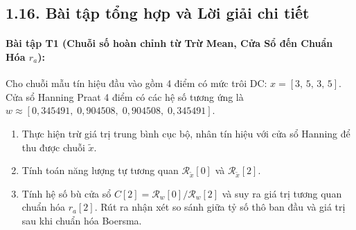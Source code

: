 \subsection*{1.16. Bài tập tổng hợp và Lời giải chi tiết}

\paragraph{Bài tập T1 (Chuỗi số hoàn chỉnh từ Trừ Mean, Cửa Sổ đến Chuẩn Hóa $r_a$):}
Cho chuỗi mẫu tín hiệu đầu vào gồm 4 điểm có mức trôi DC: $x = [3,\, 5,\, 3,\, 5]$. Cửa sổ Hanning Praat 4 điểm có các hệ số tương ứng là $w \approx [0{,}345491,\; 0{,}904508,\; 0{,}904508,\; 0{,}345491]$.
\begin{enumerate}[label=\alph*)]
    \item Thực hiện trừ giá trị trung bình cục bộ, nhân tín hiệu với cửa sổ Hanning để thu được chuỗi $\tilde{x}$.
    \item Tính toán năng lượng tự tương quan $\mathcal{R}_{\tilde{x}}[0]$ và $\mathcal{R}_{\tilde{x}}[2]$.
    \item Tính hệ số bù cửa sổ $C[2] = \mathcal{R}_w[0] / \mathcal{R}_w[2]$ và suy ra giá trị tương quan chuẩn hóa $r_a[2]$. Rút ra nhận xét so sánh giữa tỷ số thô ban đầu và giá trị sau khi chuẩn hóa Boersma.
\end{enumerate}

